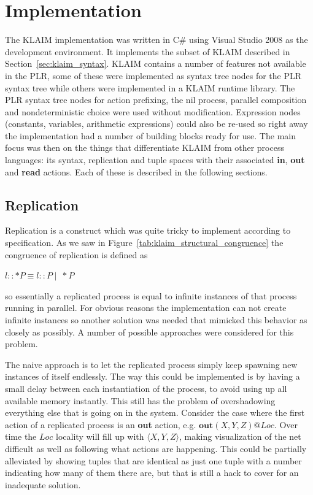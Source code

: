 \section{Implementation}
	The KLAIM implementation was written in C\# using Visual Studio 2008 as the 
	development environment. It implements the subset of KLAIM described in  
	Section~\ref{sec:klaim_syntax}. KLAIM contains a number of features not 
	available in the PLR, some of these were implemented as syntax tree nodes 
	for the PLR syntax tree while others were implemented in a KLAIM runtime 
	library. The PLR syntax tree nodes for action prefixing, the nil process, 
	parallel composition and nondeterministic choice were used without 
	modification. Expression nodes (constants, variables, arithmetic 
	expressions) could also be re-used so right away the implementation had a 
	number of building blocks ready for use. The main focus was then on the 
	things that differentiate KLAIM from other process languages: its syntax, 
	replication and tuple spaces with their associated \textbf{in}, \textbf{out} 
	and \textbf{read} actions. Each of these is described in the following 
	sections.

\subsection{Replication}
	
	Replication is a construct which was quite tricky to implement 
	according to specification. As we saw in 
	Figure~\ref{tab:klaim_structural_congruence} the congruence of replication 
	is defined as
	\begin{center}$l::*P  \equiv l::P \mid\ *P$\end{center}
	so essentially a replicated process is equal to infinite instances of that 
	process running in parallel. For obvious reasons the implementation can not 
	create infinite instances so another solution was needed that mimicked this 
	behavior as closely as possibly. A number of possible approaches were 
	considered for this problem.
	
	The naive approach is to let the replicated process simply keep
	spawning new instances of itself endlessly. The way this could be 
	implemented is by having a small delay between each instantiation of
	the process, to avoid using up all available memory instantly. This
	still has the problem of overshadowing everything else that is going
	on in the system. Consider the case where the first action of a 
	replicated process is an \textbf{out} action, e.g. 
	$\mathbf{out}(X,Y,Z)@Loc$. Over time the $Loc$ locality will fill up
	with $\langle X,Y,Z \rangle$, making visualization of the net difficult
	as well as following what actions are happening. This could be partially
	alleviated by showing tuples that are identical as just one tuple with
	a number indicating how many of them there are, but that is still a
	hack to cover for an inadequate solution.
		
